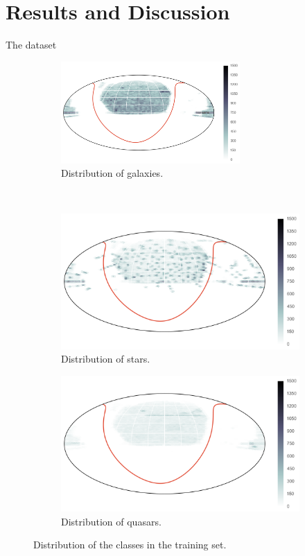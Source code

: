 

\chapter{Results and Discussion}
\label{cha:results}

The dataset

\begin{figure}[p]
	\centering
	\begin{subfigure}{\textwidth}
		\centering
		\includegraphics[width=0.75\textwidth]{figures/map_train_galaxies}
		\caption{Distribution of galaxies.}
		\label{fig:orbit1}
	\end{subfigure}\\
	\begin{subfigure}{\textwidth}
		\centering
		\includegraphics[width=0.75\linewidth]{figures/map_train_stars}
		\caption{Distribution of stars.}
		\label{fig:orbit2}
	\end{subfigure}
	\begin{subfigure}{\textwidth}
		\centering
		\includegraphics[width=0.75\linewidth]{figures/map_train_quasars}
		\caption{Distribution of quasars.}
		\label{fig:orbit3}
	\end{subfigure}
	\caption{Distribution of the classes in the training set.}
	\label{fig:orbit}
\end{figure}


